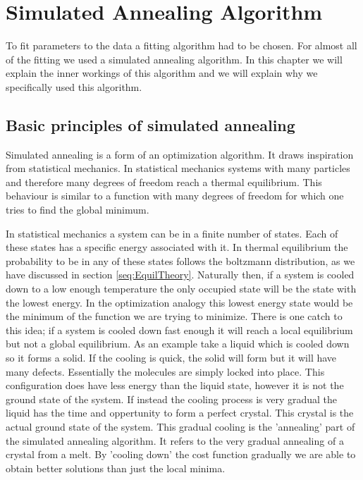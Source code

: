 
\chapter{Simulated Annealing Algorithm}
\label{ch:SA}

To fit parameters to the data a fitting algorithm had to be chosen. For almost all of the fitting we used a simulated annealing algorithm. In this chapter we will explain the inner workings of this algorithm and we will explain why we specifically used this algorithm.



\section{Basic principles of simulated annealing}

\cite{SA} %

Simulated annealing is a form of an optimization algorithm. It draws inspiration from statistical mechanics. In statistical mechanics systems with many particles and therefore many degrees of freedom reach a thermal equilibrium. This behaviour is similar to a function with many degrees of freedom for which one tries to find the global minimum.

In statistical mechanics a system can be in a finite number of states. Each of these states has a specific energy associated with it. In thermal equilibrium the probability to be in any of these states follows the boltzmann distribution, as we have discussed in section \ref{seq:EquilTheory}. Naturally then, if a system is cooled down to a low enough temperature the only occupied state will be the state with the lowest energy. In the optimization analogy this lowest energy state would be the minimum of the function we are trying to minimize. There is one catch to this idea; if a system is cooled down fast enough it will reach a local equilibrium but not a global equilibrium. As an example take a liquid which is cooled down so it forms a solid. If the cooling is quick, the solid will form but it will have many defects. Essentially the molecules are simply locked into place. This configuration does have less energy than the liquid state, however it is not the ground state of the system. If instead the cooling process is very gradual the liquid has the time and oppertunity to form a perfect crystal. This crystal is the actual ground state of the system. This gradual cooling is the 'annealing' part of the simulated annealing algorithm. It refers to the very gradual annealing of a crystal from a melt. By 'cooling down' the cost function gradually we are able to obtain better solutions than just the local minima.

